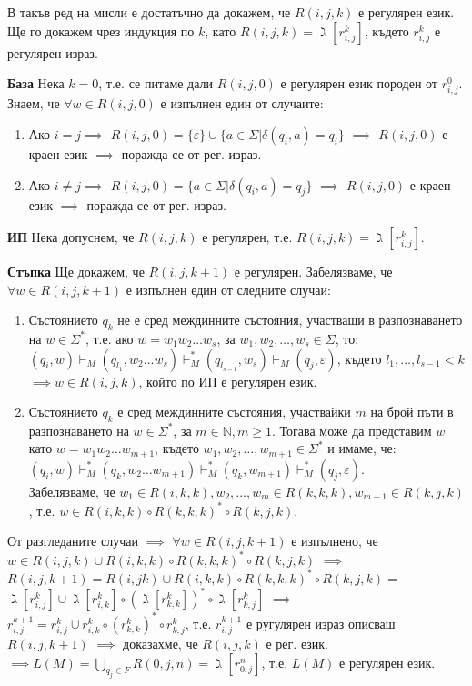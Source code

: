 \documentclass[fleqn,12pt]{article}
\begin{document}
\begin{flushleft}
В такъв ред на мисли е достатъчно да докажем, че $R(i, j, k)$ е регулярен език. Ще го докажем чрез индукция по $k$, като $R(i, j, k) = \gimel[r_{i, j}^k]$, където $r_{i, j}^k$ е регулярен израз.

\textbf{База} Нека $k = 0$, т.е. се питаме дали $R(i, j, 0)$ е регулярен език породен от $r_{i, j}^0$. Знаем, че $\forall w \in R(i, j, 0)$ е изпълнен един от случаите:
\begin{enumerate}
    \item Ако $i = j \implies$ $R(i, j, 0) = \{\varepsilon\} \cup \{a \in \Sigma | \delta(q_i, a) = q_i\}$ $\implies$ $R(i, j, 0)$ е краен език $\implies$ поражда се от рег. израз.
    \item Ако $i \neq j \implies$ $R(i, j, 0) = \{a \in \Sigma | \delta(q_i, a) = q_j\}$ $\implies$ $R(i, j, 0)$ е краен език $\implies$ поражда се от рег. израз.
\end{enumerate}

\textbf{ИП} Нека допуснем, че $R(i, j, k)$ е регулярен, т.е. $R(i, j, k) = \gimel[r_{i, j}^k]$.

\textbf{Стъпка} Ще докажем, че $R(i, j, k+1)$ е регулярен. Забелязваме, че $\forall w \in R(i, j, k+1)$ е изпълнен един от следните случаи:
\begin{enumerate}
    \item Състоянието $q_k$ не е сред междинните състояния, участващи в разпознаването на $w \in \Sigma^*$, т.е. ако $w = w_1w_2{\dots}w_s$, за $w_1, w_2, \dots, w_s \in \Sigma$, то: \\
    $(q_i, w) \vdash_M (q_{l_1}, w_2{\dots}w_s) \vdash_M^* (q_{l_{s-1}}, w_s) \vdash_M (q_j, \varepsilon)$, където ${l_1}, \dots, {l_{s-1}} < k$ $\implies w \in R(i, j, k)$, който по ИП е регулярен език.
    \item Състоянието $q_k$ е сред междинните състояния, участвайки $m$ на брой пъти в разпознаването на $w \in \Sigma^*$, за $m \in \mathbb{N}, m \geq 1$. Тогава може да представим $w$ като $w = w_1w_2{\dots}w_{m+1}$, където $w_1, w_2, \dots, w_{m+1} \in \Sigma^*$ и имаме, че: \\
    $(q_i, w) \vdash_M^* (q_k, w_2{\dots}w_{m+1}) \vdash_M^* (q_k, w_{m+1}) \vdash_M^* (q_j, \varepsilon)$. \\
    Забелязваме, че $w_1 \in R(i, k, k), w_2, \dots, w_m \in R(k, k, k), w_{m+1} \in R(k, j, k)$, т.е. $w \in R(i, k, k) \circ R(k, k, k)^* \circ R(k, j, k)$.
\end{enumerate}

От разгледаните случаи $\implies$ $\forall w \in R(i, j, k+1)$ е изпълнено, че $w \in R(i, j, k) \cup R(i, k, k) \circ R(k, k, k)^* \circ R(k, j, k)$ $\implies$ $R(i, j, k+1) = R(i, j k) \cup R(i, k, k) \circ R(k, k, k)^* \circ R(k, j, k) =$$\gimel[r_{i, j}^k] \cup \gimel[r_{i, k}^k] \circ (\gimel[r_{k, k}^k])^* \circ \gimel[r_{k, j}^k]$ $\implies$ $r_{i, j}^{k+1} = r_{i, j}^k \cup r_{i, k}^{k} \circ (r_{k, k}^{k})^* \circ r_{k, j}^{k}$, т.е. $r_{i, j}^{k+1}$ е ругулярен израз описваш $R(i, j, k+1)$ $\implies$ доказахме, че $R(i, j, k)$ е рег. език. \\
$\implies L(M) = \bigcup\limits_{q_j \in F} R(0, j, n) = \gimel[r_{0, j}^n]$, т.е. $L(M)$ е регулярен език. \square

\end{flushleft}
\end{document}
